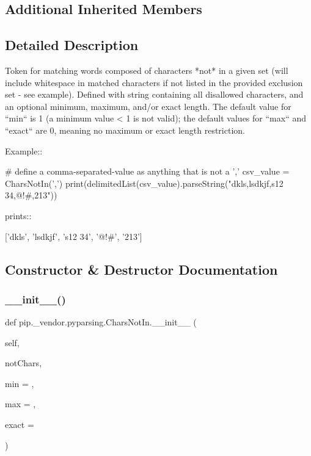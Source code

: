 \subsection*{Additional Inherited Members}


\subsection{Detailed Description}
\begin{DoxyVerb}Token for matching words composed of characters *not* in a given
set (will include whitespace in matched characters if not listed in
the provided exclusion set - see example). Defined with string
containing all disallowed characters, and an optional minimum,
maximum, and/or exact length.  The default value for ``min`` is
1 (a minimum value < 1 is not valid); the default values for
``max`` and ``exact`` are 0, meaning no maximum or exact
length restriction.

Example::

    # define a comma-separated-value as anything that is not a ','
    csv_value = CharsNotIn(',')
    print(delimitedList(csv_value).parseString("dkls,lsdkjf,s12 34,@!#,213"))

prints::

    ['dkls', 'lsdkjf', 's12 34', '@!#', '213']
\end{DoxyVerb}
 

\subsection{Constructor \& Destructor Documentation}
\mbox{\label{classpip_1_1__vendor_1_1pyparsing_1_1CharsNotIn_aceca15651bf501cef1d924b754ff2d5d}} 
\subsubsection{\texorpdfstring{\+\_\+\+\_\+init\+\_\+\+\_\+()}{\_\_init\_\_()}}
{\footnotesize\ttfamily def pip.\+\_\+vendor.\+pyparsing.\+Chars\+Not\+In.\+\_\+\+\_\+init\+\_\+\+\_\+ (\begin{DoxyParamCaption}\item[{}]{self,  }\item[{}]{not\+Chars,  }\item[{}]{min = {},  }\item[{}]{max = {},  }\item[{}]{exact = {} }\end{DoxyParamCaption})}



